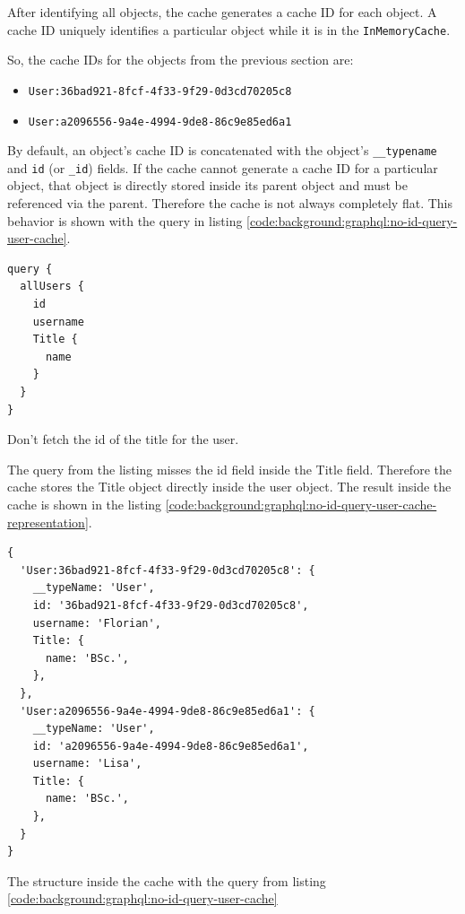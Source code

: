 After identifying all objects, the cache generates a cache ID for each object. A cache ID uniquely identifies a particular object while it is in the \texttt{InMemoryCache}.

\noindent So, the cache IDs for the objects from the previous section are:

\begin{itemize}
    \item \texttt{User:36bad921-8fcf-4f33-9f29-0d3cd70205c8}
    \item \texttt{User:a2096556-9a4e-4994-9de8-86c9e85ed6a1}
\end{itemize}

\noindent By default, an object's cache ID is concatenated with the object's \texttt{\_\_typename} and \texttt{id} (or \texttt{\_id}) fields. If the cache cannot generate a cache ID for a particular object, that object is directly stored inside its parent object and must be referenced via the parent. Therefore the cache is not always completely flat. This behavior is shown with the query in listing \ref{code:background:graphql:no-id-query-user-cache}. 

\ifshowListings
\begin{listing}[H]
    \begin{verbatim}
query {
  allUsers {
    id
    username
    Title {
      name
    }
  }
}
    \end{verbatim}
    \caption{Don't fetch the id of the title for the user.}\label{code:background:graphql:no-id-query-user-cache}
\end{listing}
\fi

\noindent The query from the listing misses the id field inside the Title field. Therefore the cache stores the Title object directly inside the user object. The result inside the cache is shown in the listing
\ref{code:background:graphql:no-id-query-user-cache-representation}. 

\ifshowListings
\begin{listing}[H]
    \begin{verbatim}
{
  'User:36bad921-8fcf-4f33-9f29-0d3cd70205c8': {
    __typeName: 'User',
    id: '36bad921-8fcf-4f33-9f29-0d3cd70205c8',
    username: 'Florian',
    Title: {
      name: 'BSc.',
    },
  },
  'User:a2096556-9a4e-4994-9de8-86c9e85ed6a1': {
    __typeName: 'User',
    id: 'a2096556-9a4e-4994-9de8-86c9e85ed6a1',
    username: 'Lisa',
    Title: {
      name: 'BSc.',
    },
  }
}
    \end{verbatim}
    \caption{The structure inside the cache with the query from listing \ref{code:background:graphql:no-id-query-user-cache}}\label{code:background:graphql:no-id-query-user-cache-representation}
\end{listing}
\fi

